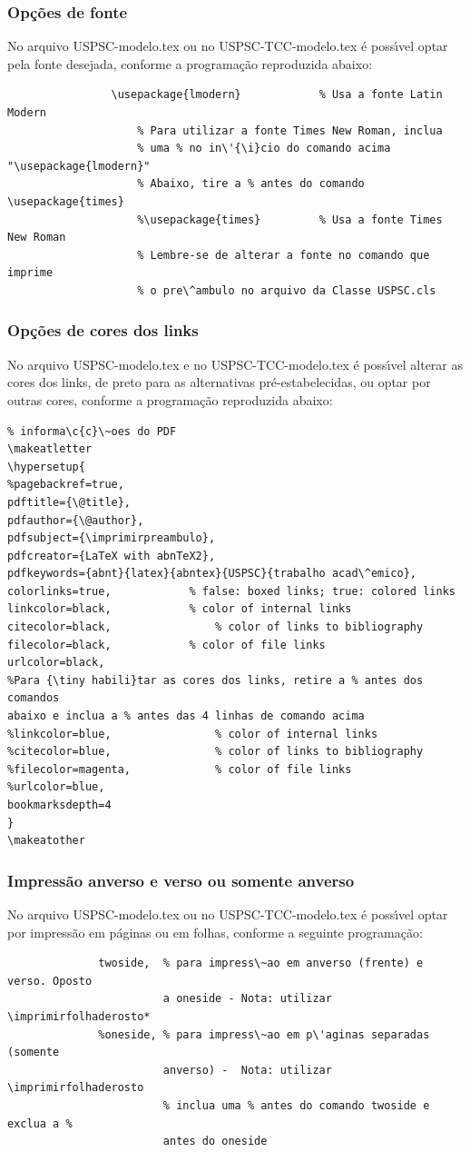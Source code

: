 \subsubsection{Op\c{c}\~oes de fonte} 
No arquivo USPSC-modelo.tex ou no USPSC-TCC-modelo.tex \'e poss\'{\i}vel optar pela fonte desejada, conforme a programa\c{c}\~ao reproduzida abaixo:
				\begin{verbatim}
				\usepackage{lmodern}			% Usa a fonte Latin Modern
					% Para utilizar a fonte Times New Roman, inclua 
					% uma % no in\'{\i}cio do comando acima  "\usepackage{lmodern}"
					% Abaixo, tire a % antes do comando  \usepackage{times}
					%\usepackage{times}			% Usa a fonte Times New Roman
					% Lembre-se de alterar a fonte no comando que imprime 
					% o pre\^ambulo no arquivo da Classe USPSC.cls					
				\end{verbatim}
\subsubsection{Op\c{c}\~oes de cores dos links}\label{coreslinks} 
No arquivo USPSC-modelo.tex e no USPSC-TCC-modelo.tex \'e poss\'{\i}vel alterar as cores dos links, de preto para as alternativas pr\'e-estabelecidas, ou optar por outras cores, conforme a programa\c{c}\~ao reproduzida abaixo:
\begin{verbatim}
% informa\c{c}\~oes do PDF
\makeatletter
\hypersetup{
%pagebackref=true,
pdftitle={\@title}, 
pdfauthor={\@author},
pdfsubject={\imprimirpreambulo},
pdfcreator={LaTeX with abnTeX2},
pdfkeywords={abnt}{latex}{abntex}{USPSC}{trabalho acad\^emico}, 
colorlinks=true,       		% false: boxed links; true: colored links
linkcolor=black,          	% color of internal links
citecolor=black,        		% color of links to bibliography
filecolor=black,      		% color of file links
urlcolor=black,
%Para {\tiny habili}tar as cores dos links, retire a % antes dos comandos 
abaixo e inclua a % antes das 4 linhas de comando acima 
%linkcolor=blue,            	% color of internal links
%citecolor=blue,        		% color of links to bibliography
%filecolor=magenta,      		% color of file links
%urlcolor=blue,
bookmarksdepth=4	
}
\makeatother				
\end{verbatim}				
\subsubsection{Impress\~ao anverso e verso ou somente anverso}
No arquivo USPSC-modelo.tex ou no USPSC-TCC-modelo.tex \'e poss\'{\i}vel optar por impress\~ao em p\'aginas ou em folhas, conforme a seguinte programa\c{c}\~ao:
			  \begin{verbatim}
			  twoside,  % para impress\~ao em anverso (frente) e verso. Oposto 
			            a oneside - Nota: utilizar \imprimirfolhaderosto*
			  %oneside, % para impress\~ao em p\'aginas separadas (somente 
			            anverso) -  Nota: utilizar \imprimirfolhaderosto
			            % inclua uma % antes do comando twoside e exclua a % 
			            antes do oneside 
			  \end{verbatim}			  
